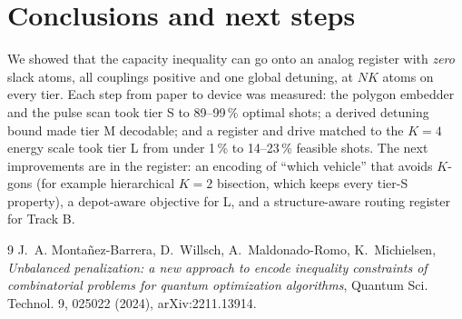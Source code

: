 \documentclass[9pt,twocolumn]{extarticle}
\begin{document}
\section{Conclusions and next steps}
We showed that the capacity inequality can go onto an analog register with \emph{zero} slack atoms, all couplings positive and one global detuning, at $NK$ atoms on every tier. Each step from paper to device was measured: the polygon embedder and the pulse scan took tier S to 89--99\,\% optimal shots; a derived detuning bound made tier M decodable; and a register and drive matched to the $K=4$ energy scale took tier L from under 1\,\% to 14--23\,\% feasible shots. The next improvements are in the register: an encoding of ``which vehicle'' that avoids $K$-gons (for example hierarchical $K=2$ bisection, which keeps every tier-S property), a depot-aware objective for L, and a structure-aware routing register for Track B.

\begin{thebibliography}{9}\small
{} J.~A. Monta\~nez-Barrera, D.~Willsch, A.~Maldonado-Romo, K.~Michielsen, \emph{Unbalanced penalization: a new approach to encode inequality constraints of combinatorial problems for quantum optimization algorithms}, Quantum Sci. Technol. 9, 025022 (2024), arXiv:2211.13914.
\end{thebibliography}
\end{document}
